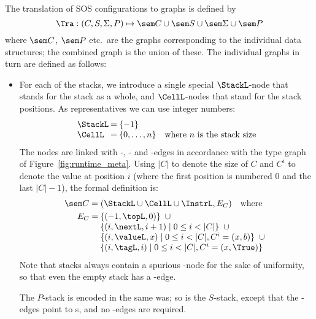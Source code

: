 The translation of SOS configurations to graphs is defined by
%
\[ \Tra: (C,S,\Sigma,P)
       \mapsto \sem C \cup \sem S\cup \sem\Sigma \cup \sem P
\]
%
where $\sem C$, $\sem P$ etc.\ are the graphs corresponding to the individual
data structures; the combined graph is the union of these. The individual
graphs in turn are defined as follows:
%
\begin{itemize}
\item For each of the stacks, we introduce a single special $\StackL$-node that
  stands for the stack as a whole, and $\CellL$-nodes that stand for the stack
  positions. As representatives we can use integer numbers:
%
\[\begin{array}{l@{{\:}}l@{{\:}}l}
\StackL & = & \{-1\} \\
\CellL & = & \{0,\ldots,n\} \quad\mbox{where $n$ is the stack size}
\end{array}\]
%
The nodes are linked with \topL-, \nextL- and -edges in accordance with
the type graph of Figure~\ref{fig:runtime_meta}. Using $|C|$ to denote the size
of $C$ and $C^i$ to denote the value at position $i$ (where the first position
is numbered 0 and the last $|C|-1$), the formal definition is:
%
\[\begin{array}{l}
\sem C = (\StackL\cup\CellL\cup \InstrL, E_C) \quad\mbox{where}\\[\smallskipamount]
\quad
\begin{array}[t]{l@{{\:}}l}
E_C = & \{(-1,\topL,0)\} \enspace\cup \\
      & \{(i,\nextL,i+1)\mid 0\leq i<|C|\} \enspace\cup \\
      & \{(i,\valueL,x)\mid 0\leq i<|C|,C^i=(x,b) \} \enspace\cup \\
      & \{(i,\tagL,i)\mid 0\leq i<|C|,C^i=(x,\True) \}
\end{array}
\end{array}\]
%
Note that stacks always contain a spurious \CellL-node for the
sake of uniformity, so that even the empty stack has a \topL-edge.

The $P$-stack is encoded in the same was; so is the $S$-stack, except that
the -edges point to \ObjectL{}s, and no \tagL-edges are required.


\end{itemize}
